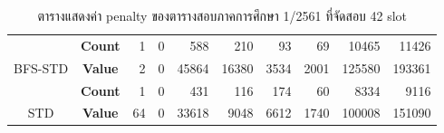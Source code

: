 \begin{table}[]
{\begin{tabular}{@{}ccrrrrrrrr@{}}
                                                 & \textbf{Count}                        & 1                         & 0                        & 588                          & 210                         & 93                          & 69                          & 10465                         & 11426                         \\ \cmidrule(l){2-10} 
    \multirow{-2}{*}{BFS-STD}                    & \textbf{Value}                        & 2                         & 0                        & 45864                        & 16380                       & 3534                        & 2001                        & 125580                        & 193361                        \\ \midrule
    {\color[HTML]{FE0000} }                      & {\color[HTML]{FE0000} \textbf{Count}} & {\color[HTML]{FE0000} 1}  & {\color[HTML]{FE0000} 0} & {\color[HTML]{FE0000} 431}   & {\color[HTML]{FE0000} 116}  & {\color[HTML]{FE0000} 174}  & {\color[HTML]{FE0000} 60}   & {\color[HTML]{FE0000} 8334}   & {\color[HTML]{FE0000} 9116}   \\ \cmidrule(l){2-10} 
    \multirow{-2}{*}{{\color[HTML]{FE0000} STD}} & {\color[HTML]{FE0000} \textbf{Value}} & {\color[HTML]{FE0000} 64} & {\color[HTML]{FE0000} 0} & {\color[HTML]{FE0000} 33618} & {\color[HTML]{FE0000} 9048} & {\color[HTML]{FE0000} 6612} & {\color[HTML]{FE0000} 1740} & {\color[HTML]{FE0000} 100008} & {\color[HTML]{FE0000} 151090} \\ \bottomrule
    \end{tabular}%
    }
    \caption{ตารางแสดงค่า penalty ของตารางสอบภาคการศึกษา 1/2561 ที่จัดสอบ 42 slot}
    \label{tab:result_table_161}
\end{table}
